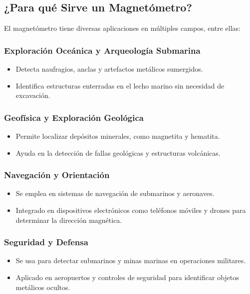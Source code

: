 \documentclass{article}
\begin{document}
	\subsection{¿Para qué Sirve un Magnetómetro?}
	El magnetómetro tiene diversas aplicaciones en múltiples campos, entre ellas:
	
	\subsubsection{Exploración Oceánica y Arqueología Submarina}
	\begin{itemize}
		\item Detecta naufragios, anclas y artefactos metálicos sumergidos.
		\item Identifica estructuras enterradas en el lecho marino sin necesidad de excavación.
	\end{itemize}
	
	\subsubsection{Geofísica y Exploración Geológica}
	\begin{itemize}
		\item Permite localizar depósitos minerales, como magnetita y hematita.
		\item Ayuda en la detección de fallas geológicas y estructuras volcánicas.
	\end{itemize}
	
	\subsubsection{Navegación y Orientación}
	\begin{itemize}
		\item Se emplea en sistemas de navegación de submarinos y aeronaves.
		\item Integrado en dispositivos electrónicos como teléfonos móviles y drones para determinar la dirección magnética.
	\end{itemize}
	
	\subsubsection{Seguridad y Defensa}
	\begin{itemize}
		\item Se usa para detectar submarinos y minas marinas en operaciones militares.
		\item Aplicado en aeropuertos y controles de seguridad para identificar objetos metálicos ocultos.
	\end{itemize}
	
\end{document}
